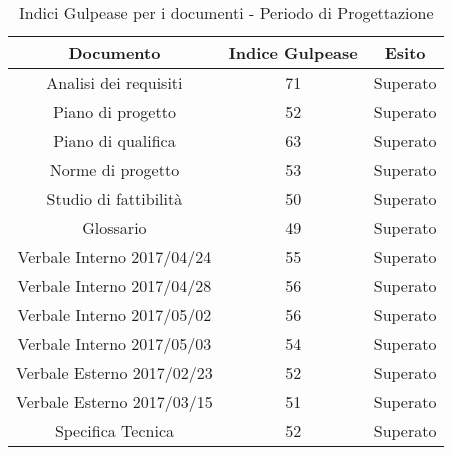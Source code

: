       
      \begin{table}[H]
        \centering
        \begin{tabular}{|c|c|c|}
          \hline
          \textbf{Documento} & \textbf{Indice Gulpease} & \textbf{Esito}\\
          \hline
          Analisi dei requisiti & 71  & Superato \\
          Piano di progetto & 52  & Superato \\
          Piano di qualifica  & 63  & Superato \\
          Norme di progetto & 53  & Superato \\
          Studio di fattibilità & 50  & Superato \\
          Glossario & 49  & Superato  \\
          Verbale Interno 2017/04/24 & 55  & Superato \\
          Verbale Interno 2017/04/28 & 56 & Superato \\
          Verbale Interno 2017/05/02 & 56  & Superato \\
          Verbale Interno 2017/05/03 & 54  & Superato \\
          Verbale Esterno 2017/02/23 & 52 & Superato \\
          Verbale Esterno 2017/03/15 & 51 & Superato \\
          Specifica Tecnica & 52 & Superato\\
          \hline
        \end{tabular}
        \caption{Indici Gulpease per i documenti - Periodo di Progettazione}
      \end{table}

